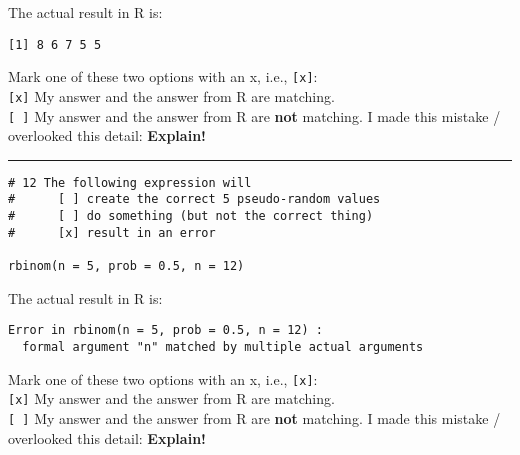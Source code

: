 \documentclass[12pt,letterpaper,final]{article}\usepackage[]{graphicx}\usepackage[]{xcolor}
\begin{document}
\begin{enumerate}
The actual result in R is: 
\begin{verbatim}
[1] 8 6 7 5 5
\end{verbatim}

Mark one of these two options with an x, i.e., \verb|[x]|: \\
\verb|[x]| My answer and the answer from R are matching. \\
\verb|[ ]| My answer and the answer from R are {\bf not} matching. 
I made this mistake / overlooked this detail: {\bf Explain!} \\


\hrule


\begin{verbatim}
# 12 The following expression will
#      [ ] create the correct 5 pseudo-random values
#      [ ] do something (but not the correct thing)
#      [x] result in an error

rbinom(n = 5, prob = 0.5, n = 12)
\end{verbatim}

The actual result in R is: 
\begin{verbatim}
Error in rbinom(n = 5, prob = 0.5, n = 12) : 
  formal argument "n" matched by multiple actual arguments
\end{verbatim}

Mark one of these two options with an x, i.e., \verb|[x]|: \\
\verb|[x]| My answer and the answer from R are matching. \\
\verb|[ ]| My answer and the answer from R are {\bf not} matching. 
I made this mistake / overlooked this detail: {\bf Explain!} \\


\end{enumerate}
\end{document}
